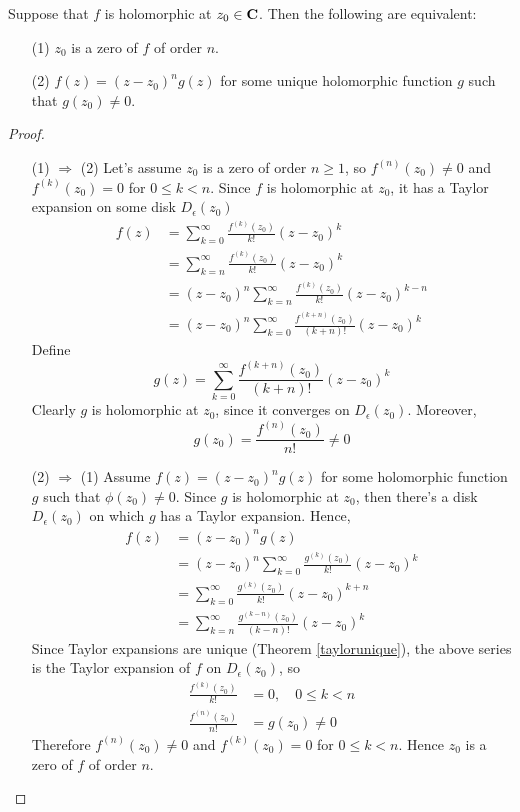 \vspace*{1em}

\begin{theorem}\label{zero-order}
Suppose that $f$ is holomorphic at $z_0 \in \mathbf C$. Then the following are equivalent:
\begin{itemize}
\item[(1)] $z_0$ is a zero of $f$ of order $n$.
\item[(2)] $f(z) = (z - z_0)^ng(z)$ for some unique holomorphic function $g$ such that $g(z_0) \neq 0$.
\end{itemize}
\end{theorem}
\begin{proof}\hfill
\begin{itemize}[leftmargin=4.5em,itemsep=1.5em]
\item[(1) $\Rightarrow$ (2)] Let's assume $z_0$ is a zero of order $n \geq 1$, so $f^{(n)}(z_0) \neq 0$ and $f^{(k)}(z_0) = 0$ for $0 \leq k < n$. Since $f$ is holomorphic at $z_0$, it has a Taylor expansion on some disk $D_\epsilon(z_0)$
\begin{align*}
f(z) &= \sum_{k=0}^\infty \frac{f^{(k)}(z_0)}{k!}(z - z_0)^k\\[0.5em]
 &= \sum_{k=n}^\infty \frac{f^{(k)}(z_0)}{k!}(z - z_0)^k\\[0.5em]
 &= (z - z_0)^n\sum_{k=n}^\infty \frac{f^{(k)}(z_0)}{k!}(z - z_0)^{k - n}\\[0.5em]
 &= (z - z_0)^n\sum_{k=0}^\infty \frac{f^{(k + n)}(z_0)}{(k+n)!}(z - z_0)^k
\end{align*}
Define
\[g(z) = \sum_{k=0}^\infty \frac{f^{(k + n)}(z_0)}{(k+n)!}(z - z_0)^k\]
Clearly $g$ is holomorphic at $z_0$, since it converges on $D_\epsilon(z_0)$. Moreover,
\[g(z_0) = \frac{f^{(n)}(z_0)}{n!} \neq 0\]

\item[(2) $\Rightarrow$ (1)] Assume $f(z) = (z - z_0)^ng(z)$ for some holomorphic function $g$ such that $\phi(z_0) \neq 0$. Since $g$ is holomorphic at $z_0$, then there's a disk $D_\epsilon(z_0)$ on which $g$ has a Taylor expansion. Hence,
\begin{align*}
f(z) &= (z - z_0)^ng(z)\\[0.5em]
 &= (z - z_0)^n\sum_{k=0}^\infty \frac{g^{(k)}(z_0)}{k!}(z - z_0)^k\\[0.5em]
 &= \sum_{k=0}^\infty \frac{g^{(k)}(z_0)}{k!}(z - z_0)^{k + n}\\[0.5em]
 &= \sum_{k=n}^\infty \frac{g^{(k - n)}(z_0)}{(k - n)!}(z - z_0)^k
\end{align*}
Since Taylor expansions are unique (Theorem \ref{taylorunique}), the above series is the Taylor expansion of $f$ on $D_\epsilon(z_0)$, so
\begin{align*}
\frac{f^{(k)}(z_0)}{k!} &= 0,\quad 0 \leq k < n\\[0.5em]
\frac{f^{(n)}(z_0)}{n!} &= g(z_0) \neq 0
\end{align*}
Therefore $f^{(n)}(z_0) \neq 0$ and $f^{(k)}(z_0) = 0$ for $0 \leq k < n$. Hence $z_0$ is a zero of $f$ of order $n$.
\end{itemize}
\vspace*{-\baselineskip}
\end{proof}

